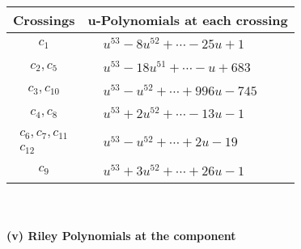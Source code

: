 \documentclass[1p]{elsarticle_modified}
\theoremstyle{definition}
\begin{document}
\begin{tabular}{m{50pt}|m{274pt}}
Crossings & \hspace{64pt}u-Polynomials at each crossing \\
\hline $$\begin{aligned}c_{1}\end{aligned}$$&$\begin{aligned}
&u^{53}-8 u^{52}+\cdots-25 u+1
\end{aligned}$\\
\hline $$\begin{aligned}c_{2},c_{5}\end{aligned}$$&$\begin{aligned}
&u^{53}-18 u^{51}+\cdots- u+683
\end{aligned}$\\
\hline $$\begin{aligned}c_{3},c_{10}\end{aligned}$$&$\begin{aligned}
&u^{53}- u^{52}+\cdots+996 u-745
\end{aligned}$\\
\hline $$\begin{aligned}c_{4},c_{8}\end{aligned}$$&$\begin{aligned}
&u^{53}+2 u^{52}+\cdots-13 u-1
\end{aligned}$\\
\hline $$\begin{aligned}c_{6},c_{7},c_{11}\\c_{12}\end{aligned}$$&$\begin{aligned}
&u^{53}- u^{52}+\cdots+2 u-19
\end{aligned}$\\
\hline $$\begin{aligned}c_{9}\end{aligned}$$&$\begin{aligned}
&u^{53}+3 u^{52}+\cdots+26 u-1
\end{aligned}$\\
\hline
\end{tabular}\\~\\
\newpage\renewcommand{\arraystretch}{1}
\flushleft \textbf{(v) Riley Polynomials at the component}\newline \\
\end{document}
